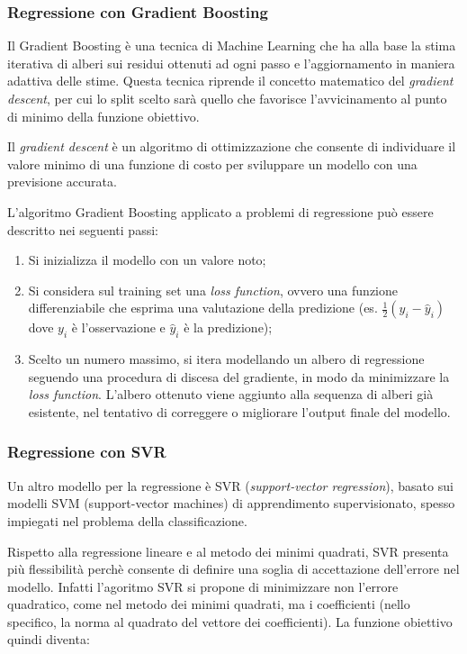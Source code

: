 \subsubsection{Regressione con Gradient Boosting}\label{sssec:regressione-gb}
Il Gradient Boosting è una tecnica di Machine Learning che ha alla base la stima iterativa di alberi sui residui ottenuti ad ogni passo e l’aggiornamento in maniera adattiva delle stime. Questa tecnica riprende il concetto matematico del \textit{gradient descent}, per cui lo split scelto sarà quello che favorisce l’avvicinamento al punto di minimo della funzione obiettivo.

Il \textit{gradient descent} è un algoritmo di ottimizzazione che consente di individuare il valore minimo di una funzione di costo per sviluppare un modello con una previsione accurata.

L’algoritmo Gradient Boosting applicato a problemi di regressione può essere descritto nei seguenti passi:

\begin{enumerate}
  \item Si inizializza il modello con un valore noto;
  \item Si considera sul training set una \textit{loss function}, ovvero una funzione differenziabile che esprima una valutazione della predizione (es. $\frac{1}{2} (y_i - \hat{y}_{i})$ dove $y_i$ è l'osservazione e $\hat{y}_{i}$ è la predizione);
  \item Scelto un numero massimo, si itera modellando un albero di regressione seguendo una procedura di discesa del gradiente, in modo da minimizzare la \textit{loss function}. L'albero ottenuto viene aggiunto alla sequenza di alberi già esistente, nel tentativo di correggere o migliorare l'output finale del modello.
\end{enumerate}


\subsubsection{Regressione con SVR}\label{sssec:regressione-svr}
Un altro modello per la regressione è SVR (\textit{support-vector regression}), basato sui modelli SVM (support-vector machines) di apprendimento supervisionato, spesso impiegati nel problema della classificazione. \cite{svm}

Rispetto alla regressione lineare e al metodo dei minimi quadrati, SVR presenta più flessibilità perchè consente di definire una soglia di accettazione dell'errore nel modello. Infatti l'agoritmo SVR si propone di minimizzare non l'errore quadratico, come nel metodo dei minimi quadrati, ma i coefficienti (nello specifico, la norma al quadrato del vettore dei coefficienti). La funzione obiettivo quindi diventa:

